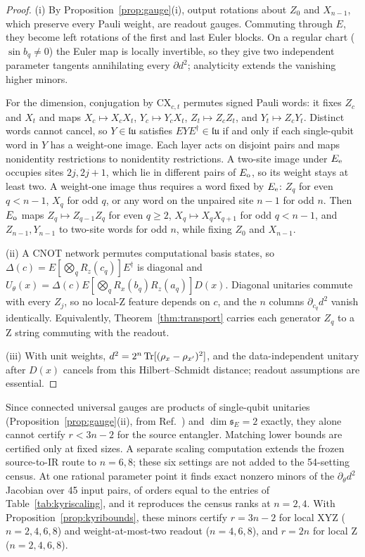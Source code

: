 \begin{proof}
(i) By Proposition~\ref{prop:gauge}(i), output rotations about $Z_0$
and $X_{n-1}$, which preserve every Pauli weight, are readout gauges.
Commuting through $E$, they become left
rotations of the first and last Euler blocks. On a regular chart
($\sin b_q\ne0$) the Euler map is locally invertible, so they give two
independent parameter tangents annihilating every $\partial d^2$;
analyticity extends the vanishing higher minors.

For the dimension, conjugation by $\mathrm{CX}_{c,t}$ permutes signed
Pauli words: it fixes $Z_c$ and $X_t$ and maps $X_c\mapsto X_cX_t$,
$Y_c\mapsto Y_cX_t$, $Z_t\mapsto Z_cZ_t$, and $Y_t\mapsto Z_cY_t$.
Distinct words cannot cancel, so $Y\in\mathfrak{lu}$ satisfies
$EYE^\dagger\in\mathfrak{lu}$ if and only if each single-qubit word
in $Y$ has a weight-one image. Each layer acts on disjoint pairs and
maps nonidentity restrictions to nonidentity restrictions. A two-site
image under $E_{\rm e}$ occupies sites $2j,2j+1$, which lie in
different pairs of $E_{\rm o}$, so its weight stays at least two. A
weight-one image thus requires a word fixed by $E_{\rm e}$: $Z_q$ for
even $q<n-1$, $X_q$ for odd $q$, or any word on the unpaired site
$n-1$ for odd $n$. Then $E_{\rm o}$ maps $Z_q\mapsto Z_{q-1}Z_q$ for
even $q\ge2$, $X_q\mapsto X_qX_{q+1}$ for odd $q<n-1$, and
$Z_{n-1},Y_{n-1}$ to two-site words for odd $n$, while fixing $Z_0$
and $X_{n-1}$.

(ii) A CNOT network permutes computational basis states, so
$\Delta(c)=E[\bigotimes_qR_z(c_q)]E^\dagger$ is diagonal and
$U_\theta(x)=\Delta(c)E[\bigotimes_qR_x(b_q)R_z(a_q)]D(x)$. Diagonal
unitaries commute with every $Z_j$, so no local-Z feature depends on
$c$, and the $n$ columns $\partial_{c_q}d^2$ vanish identically.
Equivalently, Theorem~\ref{thm:transport} carries each generator $Z_q$
to a Z string commuting with the readout.

(iii) With unit weights, $d^2=2^n\operatorname{Tr}[(\rho_x-\rho_{x'})^2]$, and the
data-independent unitary after $D(x)$ cancels from this
Hilbert--Schmidt distance; readout assumptions are essential.
\end{proof}
Since connected universal gauges are products of single-qubit
unitaries (Proposition~\ref{prop:gauge}(ii), from
Ref.~\cite{cpr2019locality}) and $\dim\mathfrak s_E=2$ exactly, they
alone cannot certify $r<3n-2$ for the source entangler. Matching lower
bounds are certified only at fixed sizes. A separate scaling
computation extends the frozen source-to-IR route to $n=6,8$; these
six settings are not added to the 54-setting census. At one rational
parameter point it finds exact nonzero minors of the
$\partial_\theta d^2$ Jacobian over 45 input pairs, of orders equal to
the entries of Table~\ref{tab:kyriscaling}, and it reproduces the
census ranks at $n=2,4$. With Proposition~\ref{prop:kyribounds}, these
minors certify $r=3n-2$ for local XYZ ($n=2,4,6,8$) and
weight-at-most-two readout ($n=4,6,8$), and $r=2n$ for local Z
($n=2,4,6,8$).


